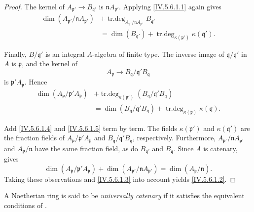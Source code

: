 \begin{proof}
The kernel of
$A_{\mathfrak p'}\to B_{\mathfrak q'}$ is
$\mathfrak nA_{\mathfrak p'}$.  Applying
\eqref{IV.5.6.1.1} again gives
\begin{equation}
\begin{split}
\dim(A_{\mathfrak p'}/\mathfrak nA_{\mathfrak p'})
 &+\operatorname{tr.deg}_{
      A_{\mathfrak p'}/\mathfrak nA_{\mathfrak p'}}
      B_{\mathfrak q'}\\
 &=\dim(B_{\mathfrak q'})
   +\operatorname{tr.deg}_{\kappa(\mathfrak p')}
      \kappa(\mathfrak q').
\end{split}
\tag{5.6.1.4}\label{IV.5.6.1.4}
\end{equation}

Finally, $B/\mathfrak q'$ is an integral $A$-algebra of finite type.
The inverse image of $\mathfrak q/\mathfrak q'$ in $A$ is
$\mathfrak p$, and the kernel of
\[
A_{\mathfrak p}\longrightarrow
 B_{\mathfrak q}/\mathfrak q'B_{\mathfrak q}
\]
is $\mathfrak p'A_{\mathfrak p}$.  Hence
\begin{equation}
\begin{split}
\dim(A_{\mathfrak p}/\mathfrak p'A_{\mathfrak p})
 &+\operatorname{tr.deg}_{\kappa(\mathfrak p')}
   (B_{\mathfrak q}/\mathfrak q'B_{\mathfrak q})\\
 &=\dim(B_{\mathfrak q}/\mathfrak q'B_{\mathfrak q})
   +\operatorname{tr.deg}_{\kappa(\mathfrak p)}
      \kappa(\mathfrak q).
\end{split}
\tag{5.6.1.5}\label{IV.5.6.1.5}
\end{equation}

Add \eqref{IV.5.6.1.4} and \eqref{IV.5.6.1.5} term by term.
The fields $\kappa(\mathfrak p')$ and
$\kappa(\mathfrak q')$ are the fraction fields of
$A_{\mathfrak p}/\mathfrak p'A_{\mathfrak p}$ and
$B_{\mathfrak q}/\mathfrak q'B_{\mathfrak q}$, respectively.
Furthermore,
$A_{\mathfrak p'}/\mathfrak nA_{\mathfrak p'}$ and
$A_{\mathfrak p}/\mathfrak n$ have the same fraction field, as do
$B_{\mathfrak q'}$ and $B_{\mathfrak q}$.  Since $A$ is catenary,
 gives
\[
\dim(A_{\mathfrak p}/\mathfrak p'A_{\mathfrak p})
 +\dim(A_{\mathfrak p'}/\mathfrak nA_{\mathfrak p'})
 =\dim(A_{\mathfrak p}/\mathfrak n).
\]
Taking these observations and \eqref{IV.5.6.1.3} into account yields
\eqref{IV.5.6.1.2}.
\end{proof}

\begin{definition}[5.6.2]
\label{IV.5.6.2}
A Noetherian ring is said to be \emph{universally catenary} if it
satisfies the equivalent conditions of .
\end{definition}

